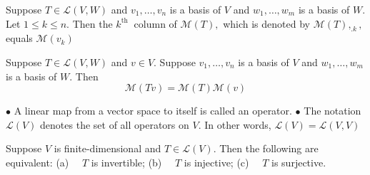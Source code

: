 Suppose $T \in \mathcal{L}(V, W)$ and $v_{1}, \ldots, v_{n}$ is a basis of $V$ and $w_{1}, \ldots, w_{m}$ is a basis of $W .$ Let $1 \leq k \leq n .$ Then the $k^{\text {th }}$ column of $\mathcal{M}(T),$ which is denoted by $\mathcal{M}(T),_{. k},$ equals $\mathcal{M}\left(v_{k}\right)$

Suppose $T \in \mathcal{L}(V, W)$ and $v \in V .$ Suppose $v_{1}, \ldots, v_{n}$ is a basis of $V$ and $w_{1}, \ldots, w_{m}$ is a basis of $W .$ Then
$$
\mathcal{M}(T v)=\mathcal{M}(T) \mathcal{M}(v)
$$

$\bullet$ A linear map from a vector space to itself is called an operator.
$\bullet$ The notation $\mathcal{L}(V)$ denotes the set of all operators on $V $. In other words, $\mathcal{L}(V)=\mathcal{L}(V, V)$

Suppose $V$ is finite-dimensional and $T \in \mathcal{L}(V) .$ Then the following are equivalent:
(a) $\quad T$ is invertible;
(b) $\quad T$ is injective;
(c) $\quad T$ is surjective.